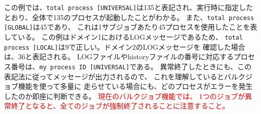 この例では、\verb|total process [UNIVERSAL]|は135と表記され、実行時に指定したとおり、全体で135のプロセスが起動したことがわかる。
また、\verb|total process [GLOBAL]|は45であり、
これは1サブジョブあたり45プロセスを使用したことを表している。
この例はドメイン1におけるLOGメッセージであるため、
\verb|total process [LOCAL]|は9で正しい。ドメイン2のLOGメッセージを
確認した場合は、36と表記される。
LOGファイルやhistoryファイルの番号に対応するプロセス番号は、\verb|my process ID [UNIVERSAL]|である。
異常終了したときにも、この表記法に従ってメッセージが出力されるので、
これを理解しているとバルクジョブ機能を使って多量に
走らせている場合にも、どのプロセスがエラーを発生したのか即座に判断できる。
\textcolor{red}{現在のバルクジョブ機能では、
1つのジョブが異常終了となると、全てのジョブが強制終了されることに注意すること。}



